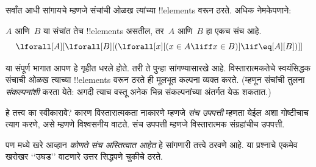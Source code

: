 \documentclass[../../../include/open-logic-section]{subfiles}
\begin{document}

सर्वांत आधी सांगायचे म्हणजे
संचांची ओळख त्यांच्या
!!{element}s वरून ठरते.
अधिक नेमकेपणाने:

\begin{axiom}[विस्तारात्मकता]
$A$ आणि~$B$ या संचांत
तेच !!{element}s
असतील, तर~$A$
आणि~$B$ हा
एकच संच आहे.
\[
  \lforall[A][\lforall[B][(\lforall[x][(x \in A \liff x \in B)] \lif
  \eq[A][B])]]
\]
\end{axiom}

या संपूर्ण भागात
आपण हे गृहीत धरले
होते. तरी ते
पुन्हा सांगण्यासारखे
आहे. विस्तारात्मकतेचे
स्वयंसिद्धक संचाची
ओळख त्याच्या
!!{element}s वरून
ठरते ही मूलभूत
कल्पना व्यक्त
करते. (म्हणून
संचांची तुलना
\emph{संकल्पनांशी}
करता येते:
अगदी त्याच
वस्तू अनेक
भिन्न संकल्पनांच्या
अंतर्गत येऊ
शकतात.)

हे तत्त्व का
स्वीकारावे? कारण
विस्तारात्मकता
नाकारणे म्हणजे
\emph{संच उपपत्ती}
म्हणता येईल
अशा गोष्टीचाच
त्याग करणे,
असे म्हणणे
विश्वसनीय वाटते.
संच उपपत्ती
म्हणजे विस्तारात्मक
संग्रहांचीच
उपपत्ती.

पण 
मध्ये खरे आव्हान
\emph{कोणते संच
अस्तित्वात आहेत}
हे सांगणारी
तत्त्वे ठरवणे
आहे. या प्रश्नाचे
एकमेव खरोखर
‘‘उघड’’ वाटणारे
उत्तर सिद्धपणे
चुकीचे ठरते.
\end{document}
